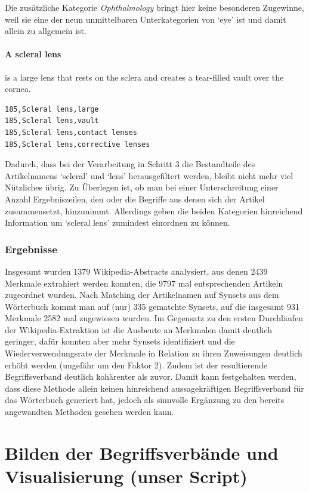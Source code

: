 \documentclass[pagesize,DIV=calc,12pt,draft]{scrreprt}
\begin{document}
Die zusätzliche Kategorie \emph{Ophthalmology} bringt hier keine besonderen Zugewinne, weil sie eine der neun unmittelbaren Unterkategorien von `eye' ist und damit allein zu allgemein ist.

\paragraph{A scleral lens}
is a large lens that rests on the sclera and creates a tear-filled vault over the cornea.

\begin{lstlisting}
185,Scleral lens,large 
185,Scleral lens,vault 
185,Scleral lens,contact lenses 
185,Scleral lens,corrective lenses
\end{lstlisting}

Dadurch, dass bei der Verarbeitung in Schritt 3 die Bestandteile des Artikelnamens `scleral' und `lens' herausgefiltert werden, bleibt nicht mehr viel Nützliches übrig. 
Zu Überlegen ist, ob man bei einer Unterschreitung einer Anzahl Ergebniszeilen, den oder die Begriffe aus denen sich der Artikel zusammensetzt, hinzunimmt. 
Allerdings geben die beiden Kategorien hinreichend Information um `scleral lens' zumindest einordnen zu können. 

\subsubsection{Ergebnisse}

Insgesamt wurden 1379 Wikipedia-Abstracts analysiert, aus denen 2439 Merkmale extrahiert werden konnten, die 9797 mal entsprechenden Artikeln zugeordnet wurden. 
Nach Matching der Artikelnamen auf Synsets aus dem Wörterbuch kommt man auf (nur) 335 gematchte Synsets, auf die insgesamt 931 Merkmale 2582 mal zugewiesen wurden. 
Im Gegensatz zu den ersten Durchläufen der Wikipedia-Extraktion ist die Ausbeute an Merkmalen damit deutlich geringer, dafür konnten aber mehr Synsets identifiziert und die Wiederverwendungsrate der Merkmale in Relation zu ihren Zuweisungen deutlich erhöht werden (ungefähr um den Faktor 2). 
Zudem ist der resultierende Begriffsverband deutlich kohärenter als zuvor. 
Damit kann festgehalten werden, dass diese Methode allein keinen hinreichend aussagekräftigen Begriffsverband für das Wörterbuch generiert hat, jedoch als sinnvolle Ergänzung zu den bereits angewandten Methoden gesehen werden kann. 

\section{Bilden der Begriffsverbände und Visualisierung (unser Script)}
\end{document}
